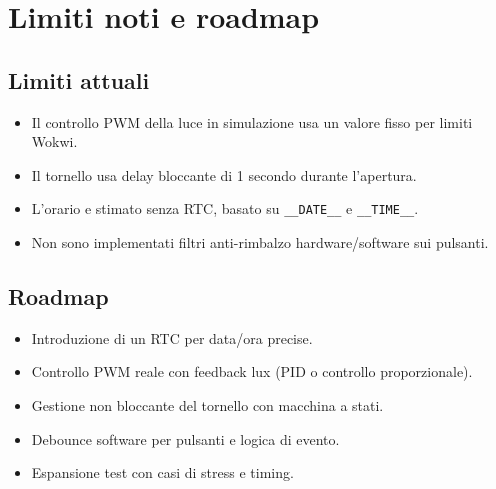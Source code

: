 \chapter{Limiti noti e roadmap}

\section{Limiti attuali}
\begin{itemize}
  \item Il controllo PWM della luce in simulazione usa un valore fisso per limiti Wokwi.
  \item Il tornello usa delay bloccante di 1 secondo durante l'apertura.
  \item L'orario e stimato senza RTC, basato su \texttt{\_\_DATE\_\_} e \texttt{\_\_TIME\_\_}.
  \item Non sono implementati filtri anti-rimbalzo hardware/software sui pulsanti.
\end{itemize}

\section{Roadmap}
\begin{itemize}
  \item Introduzione di un RTC per data/ora precise.
  \item Controllo PWM reale con feedback lux (PID o controllo proporzionale).
  \item Gestione non bloccante del tornello con macchina a stati.
  \item Debounce software per pulsanti e logica di evento.
  \item Espansione test con casi di stress e timing.
\end{itemize}
